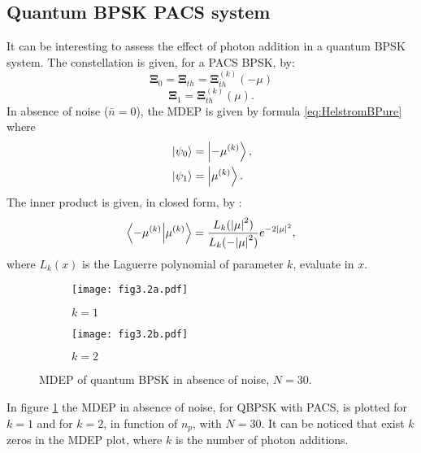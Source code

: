     \subsection{Quantum BPSK PACS system}
    It can be interesting to assess the effect of photon addition in a quantum BPSK system.
    The constellation is given, for a PACS BPSK, by:
    \begin{equation}
        \pmb{\Xi}_0 =  \pmb{\Xi}_{th} = \pmb{\Xi}_{th}^{(k)}(-\mu)
    \end{equation}
    \begin{equation*}
        \pmb{\Xi}_1 =  \pmb{\Xi}_{th}^{(k)}(\mu).
    \end{equation*}
    In absence of noise ($\bar{n}=0$), the MDEP is given by formula \ref{eq:HelstromBPure} where
    \begin{equation}
        \begin{split}
            &\ket{\psi_0}=\ket{-\mu^{(k)}},\\
            &\ket{\psi_1}=\ket{\mu^{(k)}}.
        \end{split}
    \end{equation}
    The inner product is given, in closed form, by \cite{PACSDisc}:
    \begin{equation}
        \braket{-\mu^{(k)}}{\mu^{(k)}} = \frac{L_k(\absolutevalue{\mu}^2)}{L_k(-\absolutevalue{\mu}^2)}
        e^{-2\absolutevalue{\mu}^2},
    \end{equation}
    where $L_k(x)$ is the Laguerre polynomial of parameter $k$, evaluate in $x$.
    \begin{figure}[ht]
        \begin{subfigure}{0.49\textwidth}
            \texttt{[image: fig3.2a.pdf]}
            \caption{$k=1$}
        \end{subfigure}
        \begin{subfigure}{0.46\textwidth}
            \texttt{[image: fig3.2b.pdf]}
            \caption{$k=2$}
        \end{subfigure}
        \caption{MDEP of quantum BPSK in absence of noise, $N=30$.}
        \label{fig:3.2}
    \end{figure}
    In figure \ref{fig:3.2} the MDEP in absence of noise, for QBPSK with PACS, is plotted for
    $k=1$ and for $k=2$, in function of $n_p$, with $N=30$. It can be noticed that exist $k$ zeros
    in the MDEP plot, where $k$ is the number of photon additions.

